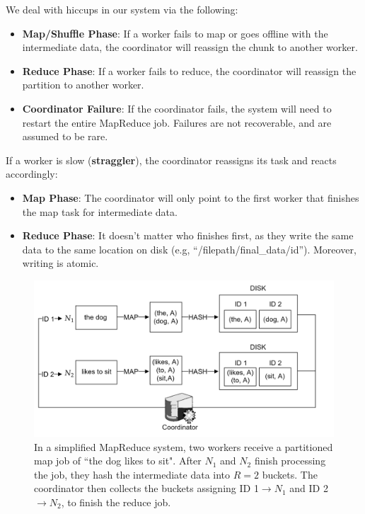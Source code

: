 \begin{Def}

    We deal with hiccups in our system via the following:
    \begin{itemize}
        \item \textbf{Map/Shuffle Phase}: If a worker fails to map or goes offline with the intermediate data, the coordinator will reassign the chunk to another worker.
        \item \textbf{Reduce Phase}: If a worker fails to reduce, the coordinator will reassign the partition to another worker.
        \item \textbf{Coordinator Failure}: If the coordinator fails, the system will need to restart the entire MapReduce job. Failures are not recoverable, and are assumed to be rare.
    \end{itemize}
\noindent
    If a worker is slow (\textbf{straggler}), the coordinator reassigns its task and reacts accordingly:
    \begin{itemize}
        \item \textbf{Map Phase}: The coordinator will only point to the first worker that finishes the map task for intermediate data.
        \item \textbf{Reduce Phase}: It doesn't matter who finishes first, as they write the same data to the same location on disk (e.g, ``/filepath/final\_data/id''). Moreover, writing is atomic.
    \end{itemize}
\end{Def}

\begin{figure}[h]
    \centering
    \includegraphics[width=\textwidth]{Sections/mapreduce/nwork.png}
    \caption{In a simplified MapReduce system, two workers receive a partitioned map job of ``the dog likes to sit". After $N_1$ and $N_2$ finish 
    processing the job, they hash the intermediate data into $R=2$ buckets. The coordinator then collects the buckets assigning ID 1$\to N_1$ and ID 2$\to N_2$, to finish the reduce job.}
    \label{fig:nwork}
\end{figure}


